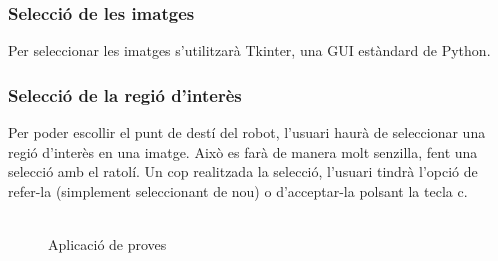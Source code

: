 	\subsubsection{Selecció de les imatges}
		Per seleccionar les imatges s'utilitzarà Tkinter\cite{Tkinter}, una GUI estàndard de Python.

	\subsubsection{Selecció de la regió d'interès}
		Per poder escollir el punt de destí del robot, l'usuari haurà de seleccionar una regió d'interès en una imatge. Això es farà de manera molt senzilla, fent una selecció amb el ratolí.
		Un cop realitzada la selecció, l'usuari tindrà l'opció de refer-la (simplement seleccionant de nou) o d'acceptar-la polsant la tecla c.\\\\
		\begin{figure}[!htb]
			\caption{Aplicació de proves}
		\end{figure}
\newpage
